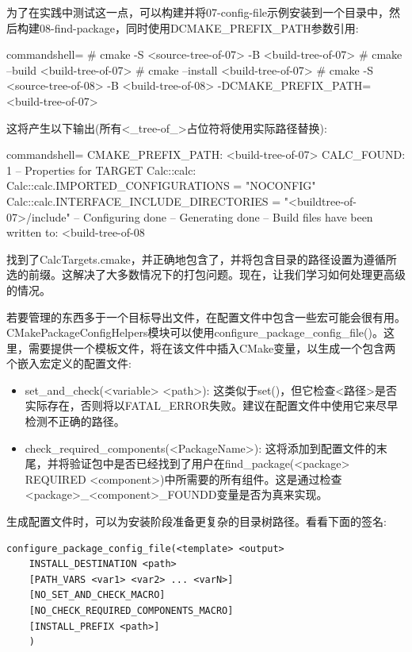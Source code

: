 为了在实践中测试这一点，可以构建并将07-config-file示例安装到一个目录中，然后构建08-find-package，同时使用DCMAKE\_PREFIX\_PATH参数引用:

\begin{tcblisting}{commandshell={}}
# cmake -S <source-tree-of-07> -B <build-tree-of-07>
# cmake --build <build-tree-of-07>
# cmake --install <build-tree-of-07>
# cmake -S <source-tree-of-08> -B <build-tree-of-08>
  -DCMAKE_PREFIX_PATH=<build-tree-of-07>
\end{tcblisting}

这将产生以下输出(所有<\_tree-of\_>占位符将使用实际路径替换):

\begin{tcblisting}{commandshell={}}
CMAKE_PREFIX_PATH: <build-tree-of-07>
CALC_FOUND: 1
--
  Properties for TARGET Calc::calc:
    Calc::calc.IMPORTED_CONFIGURATIONS = "NOCONFIG"
    Calc::calc.INTERFACE_INCLUDE_DIRECTORIES = 
      "<buildtree-of-07>/include"
-- Configuring done
-- Generating done
-- Build files have been written to: <build-tree-of-08
\end{tcblisting}

找到了CalcTargets.cmake，并正确地包含了，并将包含目录的路径设置为遵循所选的前缀。这解决了大多数情况下的打包问题。现在，让我们学习如何处理更高级的情况。


若要管理的东西多于一个目标导出文件，在配置文件中包含一些宏可能会很有用。CMakePackageConfigHelpers模块可以使用configure\_package\_config\_file()。这里，需要提供一个模板文件，将在该文件中插入CMake变量，以生成一个包含两个嵌入宏定义的配置文件:

\begin{itemize}
\item 
set\_and\_check(<variable> <path>): 这类似于set()，但它检查<路径>是否实际存在，否则将以FATAL\_ERROR失败。建议在配置文件中使用它来尽早检测不正确的路径。

\item 
check\_required\_components(<PackageName>): 这将添加到配置文件的末尾，并将验证包中是否已经找到了用户在find\_package(<package> REQUIRED  <component>)中所需要的所有组件。这是通过检查<package>\_<component>\_FOUNDD变量是否为真来实现。
\end{itemize}

生成配置文件时，可以为安装阶段准备更复杂的目录树路径。看看下面的签名:

\begin{lstlisting}[style=styleCMake]
configure_package_config_file(<template> <output>
	INSTALL_DESTINATION <path>
	[PATH_VARS <var1> <var2> ... <varN>]
	[NO_SET_AND_CHECK_MACRO]
	[NO_CHECK_REQUIRED_COMPONENTS_MACRO]
	[INSTALL_PREFIX <path>]
	)
\end{lstlisting}

